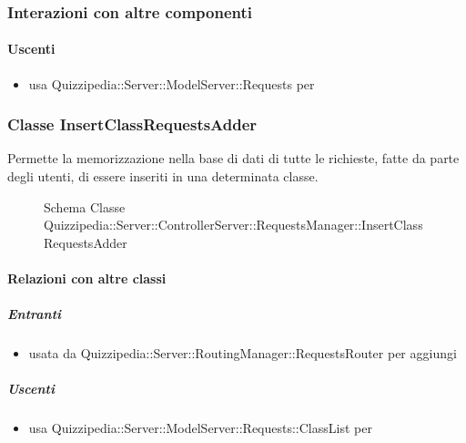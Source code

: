 \subsubsection{Interazioni con altre componenti}
\paragraph{Uscenti}
\begin{itemize}
\item usa Quizzipedia::Server::ModelServer::Requests per 
\end{itemize}
\subsubsection{Classe InsertClassRequestsAdder}
Permette la memorizzazione nella base di dati di tutte le richieste, fatte da parte degli utenti, di essere inseriti in una determinata classe.
\begin{figure}[H]
\centering
\noindent{}
\caption[Schema Classe InsertClassRequestsAdder]{Schema Classe Quizzipedia::Server::ControllerServer::RequestsManager::InsertClassRequestsAdder}
\end{figure}
\paragraph{Relazioni con altre classi}
\subparagraph{Entranti}
\begin{itemize}
\item usata da Quizzipedia::Server::RoutingManager::RequestsRouter per aggiungi
\end{itemize}
\subparagraph{Uscenti}
\begin{itemize}
\item usa Quizzipedia::Server::ModelServer::Requests::ClassList per 
\end{itemize}
